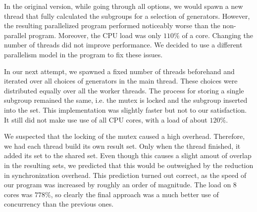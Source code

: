 \documentclass{article}
\begin{document}
In the original version, while going through all options, we would spawn a new thread that fully calculated the subgroups for a selection of generators. However, the resulting parallelized program performed noticeably worse than the non-parallel program. Moreover, the CPU load was only $110\%$ of a core. Changing the number of threads did not improve performance. We decided to use a different parallelism model in the program to fix these issues.

In our next attempt, we spawned a fixed number of threads beforehand and iterated over all choices of generators in the main thread. These choices were distributed equally over all the worker threads. The process for storing a single subgroup remained the same, i.e. the mutex is locked and the subgroup inserted into the set. This implementation was slightly faster but not to our satisfaction. It still did not make use use of all CPU cores, with a load of about $120\%$.

We suspected that the locking of the mutex caused a high overhead. Therefore, we had each thread build its own result set. Only when the thread finished, it added its set to the shared set. Even though this causes a slight amout of overlap in the resulting sets, we predicted that this would be outweighed by the reduction in synchronization overhead. This prediction turned out correct, as the speed of our program was increased by roughly an order of magnitude. The load on $8$ cores was $778\%$, so clearly the final approach was a much better use of concurrency than the previous ones.
\end{document}
